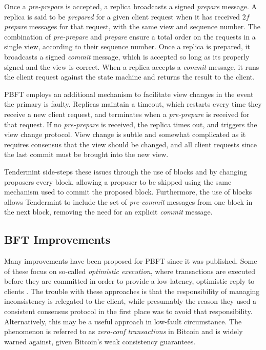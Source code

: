 Once a \emph{pre-prepare} is accepted, a replica broadcasts a signed \emph{prepare} message.
A replica is said to be \emph{prepared} for a given client request when it has received $2f$ \emph{prepare}
messages for that request, with the same view and sequence number.
The combination of \emph{pre-prepare} and \emph{prepare} ensure a total order on the requests in a single view,
according to their sequence number. 
Once a replica is prepared, it broadcasts a signed \emph{commit} message,
which is accepted so long as its properly signed and the view is correct.
When a replica accepts a \emph{commit} message, it runs the client request against the state machine and returns the result to the client.

PBFT employs an additional mechanism to facilitate view changes in the event the primary is faulty.
Replicas maintain a timeout, which restarts every time they receive a new client request, 
and terminates when a \emph{pre-prepare} is received for that request.
If no \emph{pre-prepare} is received, the replica  times out, and triggers the view change protocol.
View change is subtle and somewhat complicated as it requires consensus that the view should be changed, 
and all client requests since the last commit must be brought into the new view.

Tendermint side-steps these issues through the use of blocks and by changing proposers every block,
allowing a proposer to be skipped using the same mechanism used to commit the proposed block.
Furthermore, the use of blocks allows Tendermint to include the set of \emph{pre-commit} 
messages from one block in the next block, removing the need for an explicit \emph{commit} message.

\subsection{BFT Improvements} 

Many improvements have been proposed for PBFT since it was published.
Some of these focus on so-called \emph{optimistic execution}, 
where transactions are executed before they are committed in order to provide a low-latency,
optimistic reply to clients \cite{kotla2007zyzzyva,garcia2011efficient}.
The trouble with these approaches is that the responsibility of managing inconsistency is relegated to the client,
while presumably the reason they used a consistent consensus protocol in the first place was to avoid that responsibility.
Alternatively, this may be a useful approach in low-fault circumstance.
The phenomenon is referred to as \emph{zero-conf transactions} in Bitcoin and is widely warned against,
given Bitcoin's weak consistency guarantees.

